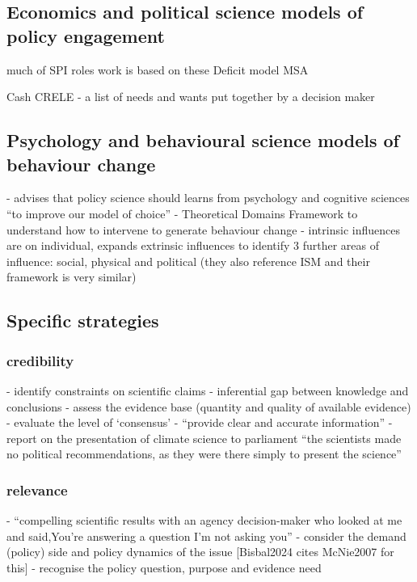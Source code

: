 \subsection{Economics and political science models of policy engagement}
much of SPI roles work is based on these
Deficit model
MSA

Cash CRELE
\cite{Bisbal2024} - a list of needs and wants put together by a decision maker

\subsection{Psychology and behavioural science models of behaviour change}
\cite{CairneyW2017} - advises that policy science should learns from psychology and cognitive sciences ``to improve our model of choice''
\cite{AtkinsFIOPIFDCGLM2017} - Theoretical Domains Framework to understand how to intervene to generate behaviour change
\cite{HamptonW2023} - intrinsic influences are on individual, expands extrinsic influences to identify 3 further areas of influence: social, physical and political (they also reference ISM and their framework is very similar)

\subsection{Specific strategies}

\subsubsection{credibility}
\cite{GluckmanBK2021} - identify constraints on scientific claims - inferential gap between knowledge and conclusions
\cite{GluckmanBK2021} - assess the evidence base (quantity and quality of available evidence)
\cite{GluckmanBK2021} - evaluate the level of `consensus'
\cite{ElsensohnACDGGKPRS2019} - ``provide clear and accurate information''
\cite{Horton2022} - report on the presentation of climate science to parliament ``the scientists made no political recommendations, as they were there simply to present the science''

\subsubsection{relevance}
\cite{Gerber2023} - ``compelling scientific results with an agency decision-maker who looked at me and said,You're answering a question I'm not asking you''
\cite{GluckmanBK2021} - consider the demand (policy) side and policy dynamics of the issue [Bisbal2024 cites McNie2007 for this]
\cite{GluckmanBK2021} - recognise the policy question, purpose and evidence need

